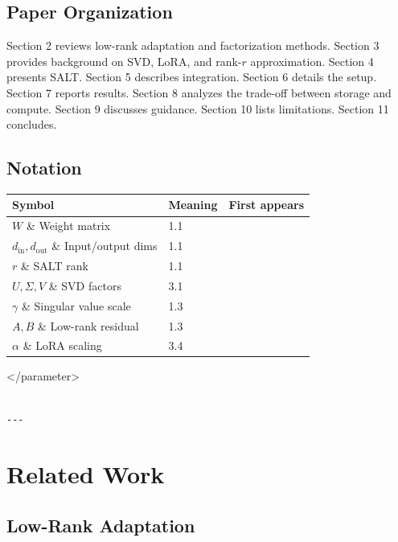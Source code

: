 \subsection{Paper Organization}

Section 2 reviews low-rank adaptation and factorization methods. Section 3 
provides background on SVD, LoRA, and rank-$r$ approximation. Section 4 
presents SALT. Section 5 describes integration. Section 6 details the setup. 
Section 7 reports results. Section 8 analyzes the trade-off between storage 
and compute. Section 9 discusses guidance. Section 10 lists limitations. 
Section 11 concludes.



\subsection{Notation}

\begin{table}[H]
\centering
\small
\begin{tabular}{lll}
\toprule
\textbf{Symbol} & \textbf{Meaning} & \textbf{First appears} \\
\midrule
$W$ \& Weight matrix & 1.1 \\
$d_\text{in}, d_\text{out}$ \& Input/output dims & 1.1 \\
$r$ \& SALT rank & 1.1 \\
$U, \Sigma, V$ \& SVD factors & 3.1 \\
$\gamma$ \& Singular value scale & 1.3 \\
$A, B$ \& Low-rank residual & 1.3 \\
$\alpha$ \& LoRA scaling & 3.4 \\
\bottomrule
\end{tabular}
\end{table}
\textless{}/parameter\textgreater{}
\begin{lstlisting}

---
\end{lstlisting}


\section{Related Work}

\subsection{Low-Rank Adaptation}

